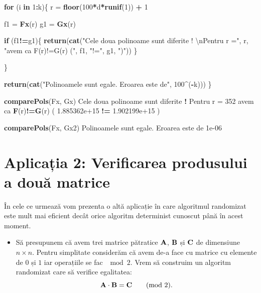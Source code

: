 \documentclass[]{article}
\newenvironment{Shaded}{\begin{snugshade}}{\end{snugshade}}
\newcommand{\KeywordTok}[1]{\textcolor[rgb]{0.13,0.29,0.53}{\textbf{#1}}}
\newcommand{\DecValTok}[1]{\textcolor[rgb]{0.00,0.00,0.81}{#1}}
\newcommand{\FloatTok}[1]{\textcolor[rgb]{0.00,0.00,0.81}{#1}}
\newcommand{\CharTok}[1]{\textcolor[rgb]{0.31,0.60,0.02}{#1}}
\newcommand{\StringTok}[1]{\textcolor[rgb]{0.31,0.60,0.02}{#1}}
\newcommand{\ControlFlowTok}[1]{\textcolor[rgb]{0.13,0.29,0.53}{\textbf{#1}}}
\newcommand{\OperatorTok}[1]{\textcolor[rgb]{0.81,0.36,0.00}{\textbf{#1}}}
\newcommand{\NormalTok}[1]{#1}
\newenvironment{frshaded*}{%
  \def\FrameCommand{\fboxrule=\FrameRule\fboxsep=\FrameSep \fcolorbox{framecolor}{shadecolor1}}%
  \MakeFramed {\advance\hsize-\width \FrameRestore}}%
{\endMakeFramed}
\newenvironment{rmdblock}[1]
  {\begin{frshaded*}
  \begin{itemize}
  \renewcommand{\labelitemi}{
    \raisebox{-.7\height}[0pt][0pt]{
      {\setkeys{Gin}{width=2em,keepaspectratio}\texttt{[image: images/icons/\#1]}}
    }
  }
  \item
  }
  {
  \end{itemize}
  \end{frshaded*}
  }
\newenvironment{rmdexercise}
  {\begin{rmdblock}{exercise}}
  {\end{rmdblock}}
\begin{document}
\begin{Shaded}
\begin{Highlighting}[]
  \ControlFlowTok{for}\NormalTok{ (i }\ControlFlowTok{in} \DecValTok{1}\OperatorTok{:}\NormalTok{k)\{}
\NormalTok{    r =}\StringTok{ }\KeywordTok{floor}\NormalTok{(}\DecValTok{100}\OperatorTok{*}\NormalTok{d}\OperatorTok{*}\KeywordTok{runif}\NormalTok{(}\DecValTok{1}\NormalTok{)) }\OperatorTok{+}\StringTok{ }\DecValTok{1}
    
\NormalTok{    f1 =}\StringTok{ }\KeywordTok{Fx}\NormalTok{(r)}
\NormalTok{    g1 =}\StringTok{ }\KeywordTok{Gx}\NormalTok{(r)}
    
    \ControlFlowTok{if}\NormalTok{ (f1}\OperatorTok{!=}\NormalTok{g1)\{}
      \KeywordTok{return}\NormalTok{(}\KeywordTok{cat}\NormalTok{(}\StringTok{"Cele doua polinoame sunt diferite ! }\CharTok{\textbackslash{}n}\StringTok{Pentru r ="}\NormalTok{, }
\NormalTok{                         r, }\StringTok{"avem ca F(r)!=G(r) ("}\NormalTok{, f1, }\StringTok{"!="}\NormalTok{, g1, }\StringTok{")"}\NormalTok{))}
\NormalTok{    \}}
    
\NormalTok{  \}}
  
  \KeywordTok{return}\NormalTok{(}\KeywordTok{cat}\NormalTok{(}\StringTok{"Polinoamele sunt egale. Eroarea este de"}\NormalTok{, }\DecValTok{100}\OperatorTok{^}\NormalTok{(}\OperatorTok{-}\NormalTok{k)))}
\NormalTok{\}}

\KeywordTok{comparePols}\NormalTok{(Fx, Gx)}
\NormalTok{Cele doua polinoame sunt diferite }\OperatorTok{!}\StringTok{ }
\NormalTok{Pentru r =}\StringTok{ }\DecValTok{352}\NormalTok{ avem ca }\KeywordTok{F}\NormalTok{(r)}\OperatorTok{!=}\KeywordTok{G}\NormalTok{(r) ( }\FloatTok{1.885362e+15} \OperatorTok{!=}\StringTok{ }\FloatTok{1.902199e+15}\NormalTok{ )}

\KeywordTok{comparePols}\NormalTok{(Fx, Gx2)}
\NormalTok{Polinoamele sunt egale. Eroarea este de }\FloatTok{1e-06}
\end{Highlighting}
\end{Shaded}

\section{Aplicația 2: Verificarea produsului a două
matrice}\label{aplicatia-2-verificarea-produsului-a-doua-matrice}

În cele ce urmează vom prezenta o altă aplicație în care algoritmul
randomizat este mult mai eficient decât orice algoritm determinist
cunoscut până în acest moment.

\begin{rmdexercise}
Să presupunem că avem trei matrice pătratice \(\bf{A}\), \(\bf{B}\) și
\(\bf{C}\) de dimensiune \(n \times n\). Pentru simplitate considerăm că
avem de-a face cu matrice cu elemente de \(0\) și \(1\) iar operațiile
se fac \(\mod2\). Vrem să construim un algoritm randomizat care să
verifice egalitatea: \[
  \bf{A}\cdot\bf{B}=\bf{C} \qquad (\text{mod 2}).
\]
\end{rmdexercise}
\end{document}
